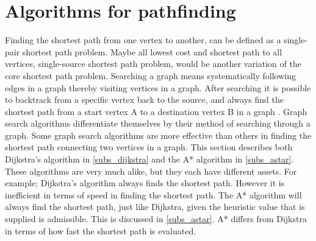 \section{Algorithms for pathfinding}

Finding the shortest path from one vertex to another, can be defined as a single-pair shortest path problem. Maybe all lowest cost and shortest path to all vertices, single-source shortest path problem, would be another variation of the core shortest path problem. Searching a graph means systematically following edges in a graph thereby visiting vertices in a graph. After searching it is possible to backtrack from a specific vertex back to the source, and always find the shortest path from a start vertex A to a destination vertex B in a graph \cite{Cormen2009}. Graph search algorithms differentiate themselves by their method of searching through a graph. Some graph search algorithms are more effective than others in finding the shortest path connecting two vertices in a graph. This section describes both Dijkstra's algorithm in \cref{subs_dijkstra} and the A* algorithm in \cref{subs_astar}. These algorithms are very much alike, but they each have different assets. For example; Dijkstra's algorithm always finds the shortest path. However it is inefficient in terms of speed in finding the shortest path. The A* algorithm will always find the shortest path, just like Dijkstra, given the heuristic value that is supplied is admissible. This is discussed in \cref{subs_astar}. A* differs from Dijkstra in terms of how fast the shortest path is evaluated.



